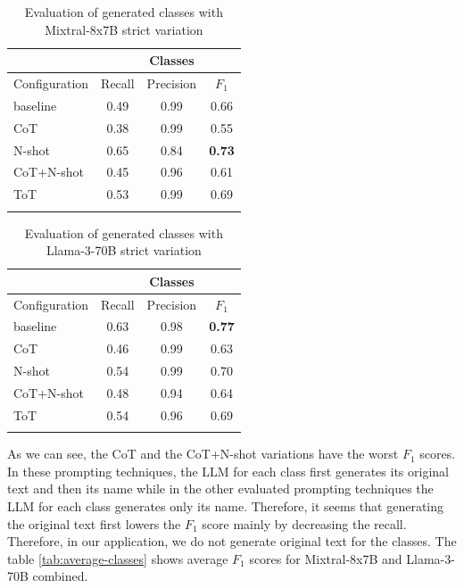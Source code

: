 \begin{table}[!h]
    \scriptsize
    \centering
    \setlength{\tabcolsep}{0.5em}
    \begin{tabular}{lccc}
    \toprule
         & & Classes & \\
     \toprule
        Configuration & Recall & Precision & $F_1$ \\
    \toprule
    
    \addlinespace
         baseline    & 0.49 & 0.99 & 0.66 \\
    	 CoT         & 0.38 & 0.99 & 0.55 \\
         N-shot      & 0.65 & 0.84 & \textbf{0.73} \\
         CoT+N-shot  & 0.45 & 0.96 & 0.61 \\
         ToT         & 0.53 & 0.99 & 0.69 \\
    \addlinespace
    \bottomrule
    \addlinespace
    \end{tabular}
    \caption{Evaluation of generated classes with Mixtral-8x7B strict variation}
    \label{tab:mixtral-classes}
\end{table}


\begin{table}[!h]
    \scriptsize
    \centering
    \setlength{\tabcolsep}{0.5em}
    \begin{tabular}{lccc}
    \toprule
    & & Classes & \\
    \toprule
        Configuration & Recall & Precision & $F_1$ \\
    \toprule
    
    \addlinespace
         baseline    & 0.63 & 0.98 & \textbf{0.77} \\
    	 CoT         & 0.46 & 0.99 & 0.63 \\
         N-shot      & 0.54 & 0.99 & 0.70 \\
         CoT+N-shot  & 0.48 & 0.94 & 0.64 \\
         ToT         & 0.54 & 0.96 & 0.69 \\
    \addlinespace
    \bottomrule
    \addlinespace
    \end{tabular}
    \caption{Evaluation of generated classes with Llama-3-70B strict variation}
    \label{tab:llama-classes}
\end{table}




As we can see, the CoT and the CoT+N-shot variations have the worst $F_1$ scores. In these prompting techniques, the LLM for each class first generates its original text and then its name while in the other evaluated prompting techniques the LLM for each class generates only its name. Therefore, it seems that generating the original text first lowers the $F_1$ score mainly by decreasing the recall. Therefore, in our application, we do not generate original text for the classes. The table \ref{tab:average-classes} shows average $F_1$ scores for Mixtral-8x7B and Llama-3-70B combined.


